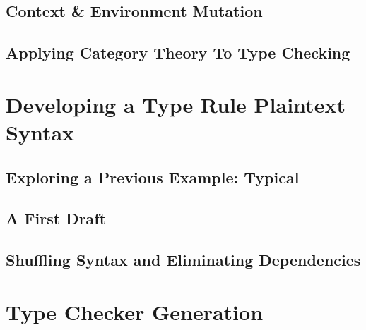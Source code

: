 \documentclass{UoYCSproject}
\begin{document}
\section{Context \& Environment Mutation}
\cite{PierceTAPL}

\section{Applying Category Theory To Type Checking}
\label{sec:CategoryTheory}
\cite{MilewskiCTFP}

\chapter{Developing a Type Rule Plaintext Syntax}

\section{Exploring a Previous Example: Typical}
\cite{Typical}

\section{A First Draft}

\section{Shuffling Syntax and Eliminating Dependencies}

\chapter{Type Checker Generation}



\printbibliography
\end{document}
